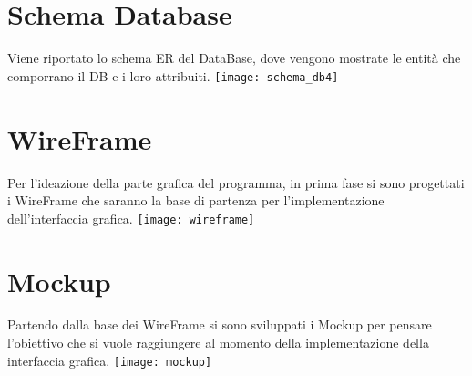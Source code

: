 \documentclass[green, fancy, 11pt]{elegantbook}
\begin{document}
\section{Schema Database}
Viene riportato lo schema ER del DataBase, dove vengono mostrate le entità che comporrano il DB e i loro attribuiti.
\noindent \texttt{[image: schema\_db4]}

\newpage
\section{WireFrame}
Per l'ideazione della parte grafica del programma, in prima fase si sono progettati i WireFrame che saranno la base di partenza per l'implementazione dell'interfaccia grafica.
\noindent \texttt{[image: wireframe]}

\newpage
\section{Mockup}
Partendo dalla base dei WireFrame si sono sviluppati i Mockup per pensare l'obiettivo che si vuole raggiungere al momento della implementazione della interfaccia grafica.
\noindent \texttt{[image: mockup]}
\end{document}
